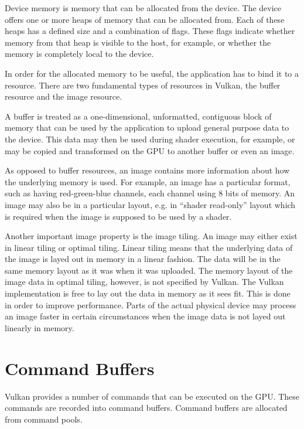     Device memory is memory that can be allocated from the device. The device offers one or more heaps of memory that can be allocated from. Each of these heaps has a defined size and a combination of flags. These flags indicate whether memory from that heap is visible to the host, for example, or whether the memory is completely local to the device.

    In order for the allocated memory to be useful, the application has to bind it to a resource. There are two fundamental types of resources in Vulkan, the buffer resource and the image resource.

    A buffer is treated as a one-dimensional, unformatted, contiguous block of memory that can be used by the application to upload general purpose data to the device. This data may then be used during shader execution, for example, or may be copied and transformed on the GPU to another buffer or even an image.

    As opposed to buffer resources, an image contains more information about how the underlying memory is used. For example, an image has a particular format, such as having red-green-blue channels, each channel using 8 bits of memory. An image may also be in a particular layout, e.g. in ``shader read-only'' layout which is required when the image is supposed to be used by a shader.

    Another important image property is the image tiling. An image may either exist in linear tiling or optimal tiling. Linear tiling means that the underlying data of the image is layed out in memory in a linear fashion. The data will be in the same memory layout as it was when it was uploaded. The memory layout of the image data in optimal tiling, however, is not specified by Vulkan. The Vulkan implementation is free to lay out the data in memory as it sees fit. This is done in order to improve performance. Parts of the actual physical device may process an image faster in certain circumstances when the image data is not layed out linearly in memory.


  \section{Command Buffers}
  \label{sec:CommandBuffers}
    Vulkan provides a number of commands that can be executed on the GPU. These commands are recorded into command buffers. Command buffers are allocated from command pools.

